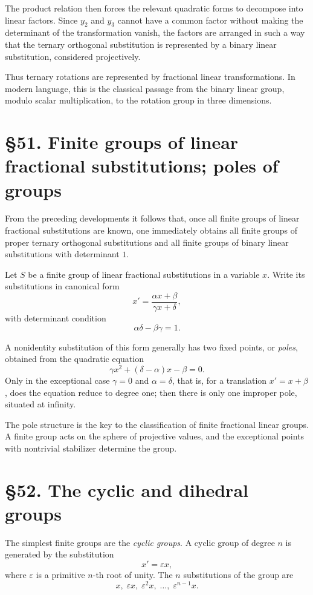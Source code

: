 \documentclass[11pt,a4paper]{book}
\newcommand{\webersection}[2]{\clearpage\section*{\S #1. #2}}
\begin{document}
The product relation then forces the relevant quadratic forms to decompose into linear factors.  Since \(y_2\) and \(y_3\) cannot have a common factor without making the determinant of the transformation vanish, the factors are arranged in such a way that the ternary orthogonal substitution is represented by a binary linear substitution, considered projectively.

Thus ternary rotations are represented by fractional linear transformations.  In modern language, this is the classical passage from the binary linear group, modulo scalar multiplication, to the rotation group in three dimensions.

\webersection{51}{Finite groups of linear fractional substitutions; poles of groups}

From the preceding developments it follows that, once all finite groups of linear fractional substitutions are known, one immediately obtains all finite groups of proper ternary orthogonal substitutions and all finite groups of binary linear substitutions with determinant \(1\).

Let \(S\) be a finite group of linear fractional substitutions in a variable \(x\).  Write its substitutions in canonical form
\begin{equation}
x'=\frac{\alpha x+\beta}{\gamma x+\delta},
\end{equation}
with determinant condition
\[
\alpha\delta-\beta\gamma=1.
\]

A nonidentity substitution of this form generally has two fixed points, or \emph{poles}, obtained from the quadratic equation
\begin{equation}
\gamma x^2+(\delta-\alpha)x-\beta=0.
\end{equation}
Only in the exceptional case \(\gamma=0\) and \(\alpha=\delta\), that is, for a translation \(x'=x+\beta\), does the equation reduce to degree one; then there is only one improper pole, situated at infinity.

The pole structure is the key to the classification of finite fractional linear groups.  A finite group acts on the sphere of projective values, and the exceptional points with nontrivial stabilizer determine the group.

\webersection{52}{The cyclic and dihedral groups}

The simplest finite groups are the \emph{cyclic groups}.  A cyclic group of degree \(n\) is generated by the substitution
\begin{equation}
x'=\varepsilon x,
\end{equation}
where \(\varepsilon\) is a primitive \(n\)-th root of unity.  The \(n\) substitutions of the group are
\begin{equation}
x,\;\varepsilon x,\;\varepsilon^2x,\;\ldots,\;\varepsilon^{n-1}x.
\end{equation}
\end{document}
